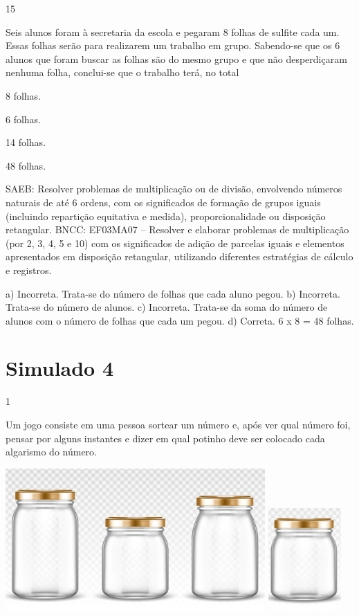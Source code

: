 \begin{multicols}{2}
\begin{enumerate}
{\num{15}

Seis alunos foram à secretaria da escola e pegaram 8 folhas de sulfite cada um. Essas folhas serão para realizarem um trabalho em grupo. Sabendo-se que os 6 alunos que foram buscar as folhas são do mesmo grupo
e que não desperdiçaram nenhuma folha, conclui-se que o trabalho terá, no total

\begin{escolha}

\item
  8 folhas.
\item
  6 folhas.
\item
  14 folhas.
\item
  48 folhas.
\end{escolha}

SAEB: Resolver problemas de multiplicação ou de divisão, envolvendo números naturais de até 6 ordens, com os significados de formação de grupos iguais (incluindo repartição equitativa e medida), proporcionalidade ou disposição retangular.
BNCC: EF03MA07 – Resolver e elaborar problemas de multiplicação (por 2, 3, 4, 5 e 10) com os
significados de adição de parcelas iguais e elementos apresentados em disposição retangular,
utilizando diferentes estratégias de cálculo e registros.

a) Incorreta. Trata-se do número de folhas que cada aluno pegou.
b) Incorreta. Trata-se do número de alunos.
c) Incorreta. Trata-se da soma do número de alunos com o número de folhas que cada um pegou.
d) Correta. 6 x 8 = 48 folhas.

\chapter{Simulado 4}

\num{1}

Um jogo consiste em uma pessoa sortear um número e, após ver qual número foi, pensar por alguns instantes e dizer em qual potinho deve ser colocado cada algarismo do número.

\includegraphics[width=3.90833in,height=2.14168in]{media/image129.png}
\includegraphics[width=1.10010in,height=1.54180in]{media/image130.png}

}
\end{enumerate}
\end{multicols}
